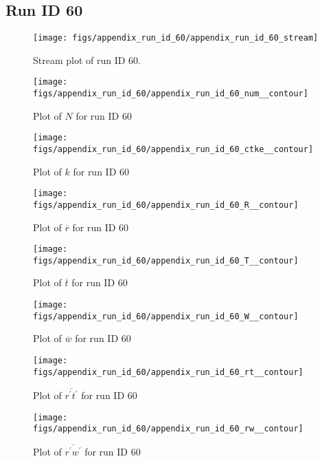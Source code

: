 \subsection{Run ID 60}
\begin{figure}[H]
\centering
\texttt{[image: figs/appendix\_run\_id\_60/appendix\_run\_id\_60\_stream]}
\caption{Stream plot of run ID 60.}
\label{fig:appendix_run_id_60_stream}
\end{figure}


\begin{figure}[H]
\centering
\texttt{[image: figs/appendix\_run\_id\_60/appendix\_run\_id\_60\_num\_\_contour]}
\caption{Plot of $N$ for run ID 60}
\label{fig:appendix_run_id_60_num__contour}
\end{figure}


\begin{figure}[H]
\centering
\texttt{[image: figs/appendix\_run\_id\_60/appendix\_run\_id\_60\_ctke\_\_contour]}
\caption{Plot of $k$ for run ID 60}
\label{fig:appendix_run_id_60_ctke__contour}
\end{figure}


\begin{figure}[H]
\centering
\texttt{[image: figs/appendix\_run\_id\_60/appendix\_run\_id\_60\_R\_\_contour]}
\caption{Plot of $\overline{r}$ for run ID 60}
\label{fig:appendix_run_id_60_R__contour}
\end{figure}


\begin{figure}[H]
\centering
\texttt{[image: figs/appendix\_run\_id\_60/appendix\_run\_id\_60\_T\_\_contour]}
\caption{Plot of $\overline{t}$ for run ID 60}
\label{fig:appendix_run_id_60_T__contour}
\end{figure}


\begin{figure}[H]
\centering
\texttt{[image: figs/appendix\_run\_id\_60/appendix\_run\_id\_60\_W\_\_contour]}
\caption{Plot of $\overline{w}$ for run ID 60}
\label{fig:appendix_run_id_60_W__contour}
\end{figure}


\begin{figure}[H]
\centering
\texttt{[image: figs/appendix\_run\_id\_60/appendix\_run\_id\_60\_rt\_\_contour]}
\caption{Plot of $\overline{r^\prime t^\prime}$ for run ID 60}
\label{fig:appendix_run_id_60_rt__contour}
\end{figure}


\begin{figure}[H]
\centering
\texttt{[image: figs/appendix\_run\_id\_60/appendix\_run\_id\_60\_rw\_\_contour]}
\caption{Plot of $\overline{r^\prime w^\prime}$ for run ID 60}
\label{fig:appendix_run_id_60_rw__contour}
\end{figure}



